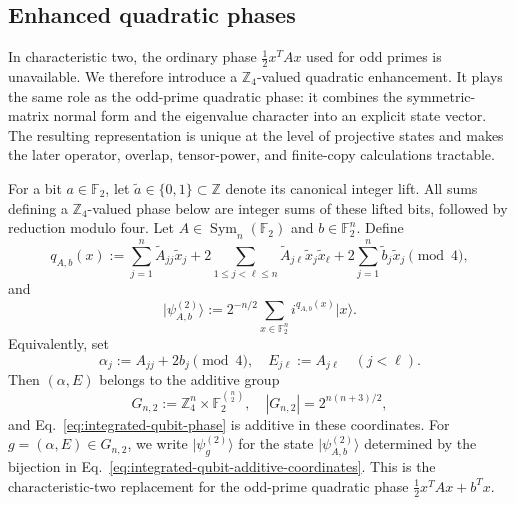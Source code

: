 \documentclass[11pt]{article}
\newcommand{\F}{\mathbb F}
\newcommand{\Sym}{\operatorname{Sym}}
\newcommand{\1}{\mathbf 1}
\newcommand{\ket}[1]{\lvert #1\rangle}
\theoremstyle{plain}
\theoremstyle{definition}
\theoremstyle{remark}
\begin{document}
\subsection{Enhanced quadratic phases}
\label{subsec:integrated-qubit-phases}
In characteristic two, the ordinary phase $\frac12x^TAx$ used for odd primes
is unavailable.  We therefore introduce a $\mathbb Z_4$-valued quadratic
enhancement.  It plays the same role as the odd-prime quadratic phase: it
combines the symmetric-matrix normal form and the eigenvalue character into an
explicit state vector.  The resulting representation is unique at the level
of projective states and makes the later operator, overlap, tensor-power, and
finite-copy calculations tractable.

For a bit $a\in\F_2$, let $\widetilde a\in\{0,1\}\subset\mathbb Z$
denote its canonical integer lift.  All sums defining a $\mathbb Z_4$-valued
phase below are integer sums of these lifted bits, followed by reduction
modulo four.  Let $A\in\Sym_n(\F_2)$ and $b\in\F_2^n$.  Define
\begin{equation}
 q_{A,b}(x):=
 \sum_{j=1}^n \widetilde A_{jj}\widetilde x_j
 +2\sum_{1\le j<\ell\le n}
   \widetilde A_{j\ell}\widetilde x_j\widetilde x_\ell
 +2\sum_{j=1}^n\widetilde b_j\widetilde x_j\pmod4,
 \label{eq:integrated-qubit-phase}
\end{equation}
and
\begin{equation}
 \ket{\psi_{A,b}^{(2)}}
 :=2^{-n/2}\sum_{x\in\F_2^n}i^{q_{A,b}(x)}\ket{x}.
 \label{eq:integrated-qubit-state}
\end{equation}
Equivalently, set
\begin{equation}
 \alpha_j:=A_{jj}+2b_j\pmod4,
 \quad E_{j\ell}:=A_{j\ell}\quad(j<\ell).
 \label{eq:integrated-qubit-additive-coordinates}
\end{equation}
Then $(\alpha,E)$ belongs to the additive group
\begin{equation}
 G_{n,2}:=\mathbb Z_4^n\times\F_2^{\binom n2},
 \quad |G_{n,2}|=2^{n(n+3)/2},
 \label{eq:integrated-qubit-group}
\end{equation}
and Eq.~\eqref{eq:integrated-qubit-phase} is additive in these coordinates.
For $g=(\alpha,E)\in G_{n,2}$, we write $\ket{\psi_g^{(2)}}$ for the
state $\ket{\psi_{A,b}^{(2)}}$ determined by the bijection in
Eq.~\eqref{eq:integrated-qubit-additive-coordinates}.
This is the characteristic-two replacement for the odd-prime quadratic phase
$\frac12x^TAx+b^Tx$.
\end{document}
